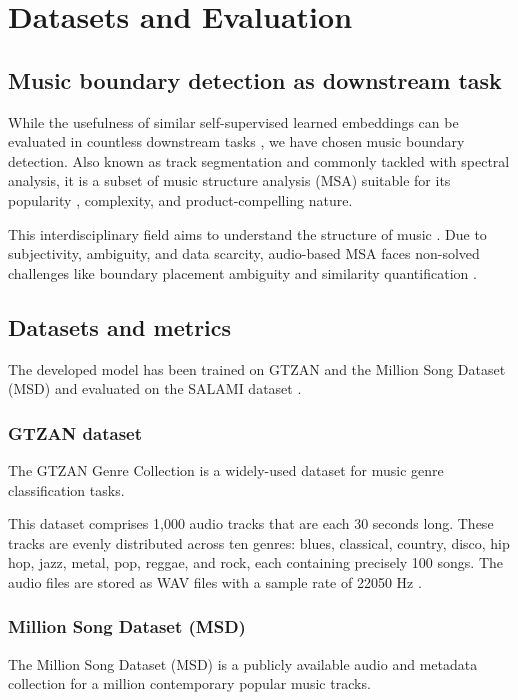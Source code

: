 \chapter{Datasets and Evaluation}

\section{Music boundary detection as downstream task}

While the usefulness of similar self-supervised learned embeddings can be evaluated in countless downstream tasks \cite{Li2023MERT:Training, Kim2020OneStrategies}, we have chosen music boundary detection. Also known as track segmentation and commonly tackled with spectral analysis, it is a subset of music structure analysis (MSA) suitable for its popularity \cite{Smith2013ATask}, complexity, and product-compelling nature. 

This interdisciplinary field aims to understand the structure of music \cite{Nieto2020Audio-BasedApplications}. Due to subjectivity, ambiguity, and data scarcity, audio-based MSA faces non-solved challenges like boundary placement ambiguity and similarity quantification \cite{NietoPerceptualMusic}.  


\section{Datasets and metrics}

The developed model has been trained on GTZAN \cite{GTZAN} and the Million Song Dataset (MSD) \cite{MSD} and evaluated on the SALAMI dataset \cite{Smith2011DESIGNANNOTATIONS}. 

\subsection{GTZAN dataset}
The GTZAN Genre Collection is a widely-used dataset for music genre classification tasks.

This dataset comprises 1,000 audio tracks that are each 30 seconds long. These tracks are evenly distributed across ten genres: blues, classical, country, disco, hip hop, jazz, metal, pop, reggae, and rock, each containing precisely 100 songs. The audio files are stored as WAV files with a sample rate of 22050 Hz \cite{GTZAN}.

\subsection{Million Song Dataset (MSD)}
The Million Song Dataset (MSD) is a publicly available audio and metadata collection for a million contemporary popular music tracks.


